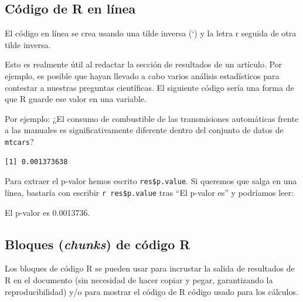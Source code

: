 \documentclass[
]{book}
\newenvironment{Shaded}{\begin{snugshade}}{\end{snugshade}}
\newcommand{\AttributeTok}[1]{\textcolor[rgb]{0.77,0.63,0.00}{#1}}
\newcommand{\FunctionTok}[1]{\textcolor[rgb]{0.00,0.00,0.00}{#1}}
\newcommand{\NormalTok}[1]{#1}
\newcommand{\OtherTok}[1]{\textcolor[rgb]{0.56,0.35,0.01}{#1}}
\newcommand{\SpecialCharTok}[1]{\textcolor[rgb]{0.00,0.00,0.00}{#1}}
\begin{document}
\hypertarget{cuxf3digo-de-r-en-luxednea}{%
\subsection{Código de R en línea}\label{cuxf3digo-de-r-en-luxednea}}

El código en línea se crea usando una tilde inversa (`) y la letra r seguida de otra tilde inversa.

Esto es realmente útil al redactar la sección de resultados de un artículo. Por ejemplo, es posible que hayan llevado a cabo varios análisis estadísticos para contestar a nuestras preguntas científicas. El siguiente código sería una forma de que R guarde ese valor en una variable.

Por ejemplo: ¿El consumo de combustible de las transmisiones automáticas frente a las manuales es significativamente diferente dentro del conjunto de datos de \texttt{mtcars}?

\begin{Shaded}
\end{Shaded}

\begin{verbatim}
[1] 0.001373638
\end{verbatim}

Para extraer el p-valor hemos escrito \texttt{res\$p.value}. Si queremos que salga en una línea, bastaría con escribir \texttt{\textasciigrave{}r\ res\$p.value\textasciigrave{}} tras ``El p-valor es'' y podríamos leer:

El p-valor es 0.0013736.

\hypertarget{bloques-chunks-de-cuxf3digo-r}{%
\subsection{\texorpdfstring{Bloques (\emph{chunks}) de código R}{Bloques (chunks) de código R}}\label{bloques-chunks-de-cuxf3digo-r}}

Los bloques de código R se pueden usar para incrustar la salida de resultados de R en el documento (sin necesidad de hacer copiar y pegar, garantizando la reproducibilidad) y/o para mostrar el código de R código usado para los cálculos.
\end{document}
